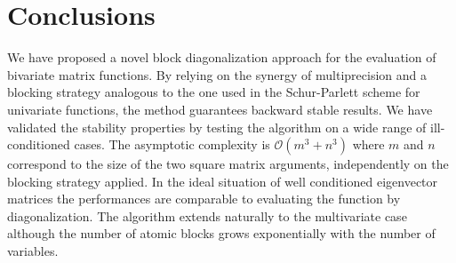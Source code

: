 \documentclass{siamart1116}
\begin{document}
\section{Conclusions}\label{sec:conclusion}
We have proposed a novel block diagonalization approach for the evaluation of bivariate matrix functions. 
By relying on the synergy of multiprecision and a blocking strategy analogous to the one used 
in the Schur-Parlett scheme for univariate functions, the method guarantees backward stable results. 
We have validated the stability properties by testing the algorithm on a wide range of ill-conditioned cases.
The asymptotic complexity is $\mathcal O(m^3+n^3)$ where $m$ and $n$ correspond to the size of the two square 
matrix arguments, independently on the blocking strategy applied. 
In the ideal situation of well conditioned eigenvector matrices the performances are comparable to evaluating the 
function by diagonalization. The algorithm extends naturally to the multivariate case although the number of atomic
blocks grows exponentially with the number of variables. 
   


\end{document}
